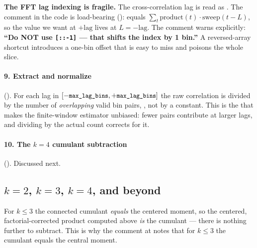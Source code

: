 \begin{gotcha}
\textbf{The FFT lag indexing is fragile.} The cross-correlation lag is read as
. The comment in the code is load-bearing
(): 
equals $\sum_t \text{product}(t)\cdot\text{sweep}(t-L)$, so the value we want at
$+\text{lag}$ lives at $L = -\text{lag}$. The comment warns explicitly:
\textbf{``Do NOT use \texttt{[::-1]} --- that shifts the index by 1 bin.''} A
reversed-array shortcut introduces a one-bin offset that is easy to miss and
poisons the whole slice.
\end{gotcha}

\paragraph{9. Extract and normalize} (). For
each lag in $[-\texttt{\small max\_lag\_bins}, +\texttt{\small max\_lag\_bins}]$ the raw correlation
is divided by the number of \emph{overlapping} valid bin pairs,
, not by a constant. This is the
 that makes the finite-window estimator
unbiased: fewer pairs contribute at larger lags, and dividing by the actual count
corrects for it.

\paragraph{10. The $k=4$ cumulant subtraction} ().
Discussed next.

\subsection{$k=2$, $k=3$, $k=4$, and beyond}

For $k \le 3$ the connected cumulant \emph{equals} the centered moment, so the
centered, factorial-corrected product computed above \emph{is} the cumulant ---
there is nothing further to subtract. This is why the comment at
 notes that for $k \le 3$ the cumulant equals
the central moment.

